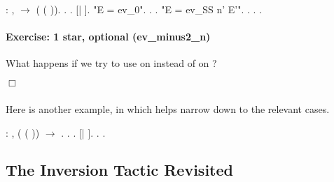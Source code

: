 \documentclass[12pt]{report}
\begin{document}
 \begin{coqdoccode}
\coqdocemptyline
\coqdocnoindent
{} : \coqdockw{\ensuremath{\forall}} ,    \ensuremath{\rightarrow}  ( ( )).\coqdoceol
\coqdocnoindent
{}.\coqdoceol
\coqdocindent{1.00em}
  .\coqdoceol
\coqdocindent{1.00em}
   [|  ].\coqdoceol
\coqdocindent{1.00em}
 "E = ev\_0". .  .\coqdoceol
\coqdocindent{1.00em}
 "E = ev\_SS n' E'". .  . .\coqdoceol
\coqdocemptyline
\end{coqdoccode}
\paragraph{Exercise: 1 star, optional (ev\_minus2\_n)}

 What happens if we try to use  on  instead of  on ? \begin{coqdoccode}
\coqdocemptyline
\end{coqdoccode}
\ensuremath{\Box} 

\subsubsection{ }

 Here is another example, in which  helps narrow down to
the relevant cases. \begin{coqdoccode}
\coqdocemptyline
\coqdocnoindent
{}  : \coqdockw{\ensuremath{\forall}} ,\coqdoceol
\coqdocindent{1.00em}
 ( ( )) \ensuremath{\rightarrow}  .\coqdoceol
\coqdocnoindent
{}.\coqdoceol
\coqdocindent{1.00em}
  .\coqdoceol
\coqdocindent{1.00em}
   [|  ].\coqdoceol
\coqdocindent{1.00em}
 . .\coqdoceol
\coqdocemptyline
\end{coqdoccode}
\subsection{The Inversion Tactic Revisited}
\end{document}
